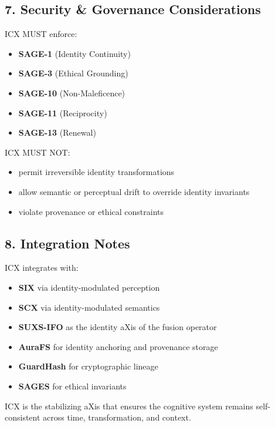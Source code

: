\subsection{7. Security \& Governance Considerations}\label{security-governance-considerations}

ICX MUST enforce:

\begin{itemize}
\tightlist
\item
  \textbf{SAGE-1} (Identity Continuity)
\item
  \textbf{SAGE-3} (Ethical Grounding)
\item
  \textbf{SAGE-10} (Non-Maleficence)
\item
  \textbf{SAGE-11} (Reciprocity)
\item
  \textbf{SAGE-13} (Renewal)
\end{itemize}

ICX MUST NOT:

\begin{itemize}
\tightlist
\item
  permit irreversible identity transformations
\item
  allow semantic or perceptual drift to override identity invariants
\item
  violate provenance or ethical constraints
\end{itemize}

\subsection{8. Integration Notes}\label{integration-notes}

ICX integrates with:

\begin{itemize}
\tightlist
\item
  \textbf{SIX} via identity-modulated perception
\item
  \textbf{SCX} via identity-modulated semantics
\item
  \textbf{SUXS-IFO} as the identity aXis of the fusion operator
\item
  \textbf{AuraFS} for identity anchoring and provenance storage
\item
  \textbf{GuardHash} for cryptographic lineage
\item
  \textbf{SAGES} for ethical invariants
\end{itemize}

ICX is the stabilizing aXis that ensures the cognitive system remains self-consistent across time, transformation, and context.

